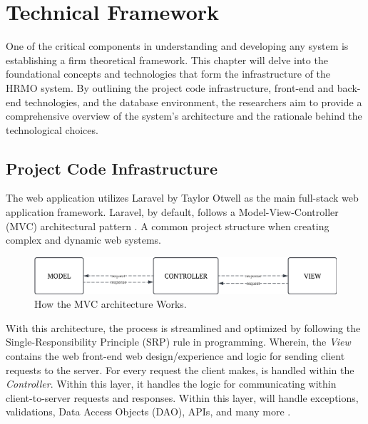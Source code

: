 \chapter{Technical Framework} 

One of the critical components in understanding and developing any system is establishing a firm theoretical framework. This chapter will delve into the foundational concepts and technologies that form the infrastructure of the HRMO system. By outlining the project code infrastructure, front-end and back-end technologies, and the database environment, the researchers aim to provide a comprehensive overview of the system's architecture and the rationale behind the technological choices. 

\section{Project Code Infrastructure}

    The web application utilizes Laravel by Taylor Otwell as the main full-stack web application framework. Laravel, by default, follows a Model-View-Controller (MVC) architectural pattern \cite{medium12023}. A common project structure when creating complex and dynamic web systems. 
    
    \begin{figure}[H]
        \centering
        \includegraphics[width=1\linewidth]{figures/fig-1.png}
        \caption{How the MVC architecture Works.}
        \label{fig:enter-label}
    \end{figure}
    
    With this architecture, the process is streamlined and optimized by following the Single-Responsibility Principle (SRP) rule in programming. Wherein, the \textit{View} contains the web front-end web design/experience and logic for sending client requests to the server. For every request the client makes, is handled within the \textit{Controller}. Within this layer, it handles the logic for communicating within client-to-server requests and responses. Within this layer, will handle exceptions, validations, Data Access Objects (DAO), APIs, and many more \cite{mdn12023}.
    
